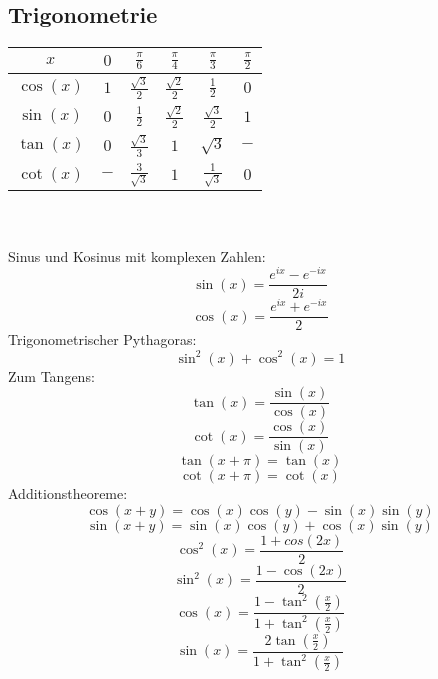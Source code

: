 \documentclass[a4paper,twocolumn,10pt]{article}
\begin{document}
\subsection{Trigonometrie}
\begin{tabular}{|c|c|c|c|c|c|}
\hline $x$ & $0$ & $\frac{\pi}{6}$ & $\frac{\pi}{4}$ & $\frac{\pi}{3}$ & $\frac{\pi}{2}$\\
\hline $\cos(x)$ & $1$ & $\frac{\sqrt{3}}{2}$ & $\frac{\sqrt{2}}{2}$ & $\frac{1}{2}$ & $0$\\
\hline $\sin(x)$ & $0$ & $\frac{1}{2}$ & $\frac{\sqrt{2}}{2}$ & $\frac{\sqrt{3}}{2}$ & $1$\\
\hline $\tan(x)$ & $0$ & $\frac{\sqrt{3}}{3}$ & $1$ & $\sqrt{3}$ & $-$\\
\hline $\cot(x)$ & $-$ & $\frac{3}{\sqrt{3}}$ & $1$ & $\frac{1}{\sqrt{3}}$ & $0$\\
\hline
\end{tabular}\\\\
Sinus und Kosinus mit komplexen Zahlen:
\begin{equation*}
\sin(x)=\frac{e^{ix}-e^{-ix}}{2i}
\end{equation*}
\begin{equation*}
\cos(x)=\frac{e^{ix}+e^{-ix}}{2}
\end{equation*}
Trigonometrischer Pythagoras:\\
\begin{equation*}
\sin^2(x)+\cos^2(x)=1
\end{equation*}
Zum Tangens:\\
\begin{equation*}
\tan(x)=\frac{\sin(x)}{\cos(x)}
\end{equation*}
\begin{equation*}
\cot(x)=\frac{\cos(x)}{\sin(x)}
\end{equation*}
\begin{equation*}
\tan(x+\pi)=\tan(x)
\end{equation*}
\begin{equation*}
\cot(x+\pi)=\cot(x)
\end{equation*}
Additionstheoreme:\\
\begin{equation*}
\cos(x+y)=\cos(x)\cos(y)-\sin(x)\sin(y)
\end{equation*}
\begin{equation*}
\sin(x+y)=\sin(x)\cos(y)+\cos(x)\sin(y)
\end{equation*}
\begin{equation*}
\cos^2(x)=\frac{1+cos(2x)}{2}
\end{equation*}
\begin{equation*}
\sin^2(x)=\frac{1-\cos(2x)}{2}
\end{equation*}
\begin{equation*}
\cos(x)=\frac{1-\tan^2(\frac{x}{2})}{1+\tan^2(\frac{x}{2})}
\end{equation*}
\begin{equation*}
\sin(x)=\frac{2\tan(\frac{x}{2})}{1+\tan^2(\frac{x}{2})}
\end{equation*}
\end{document}
